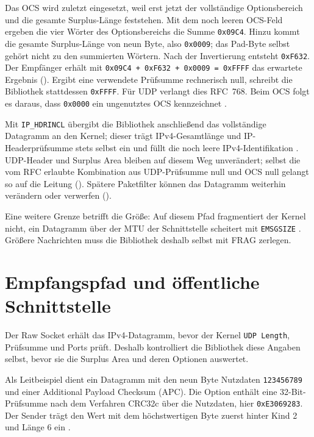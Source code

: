 Das OCS wird zuletzt eingesetzt, weil erst jetzt der vollständige Optionsbereich und die gesamte
Surplus-Länge feststehen. Mit dem noch leeren OCS-Feld ergeben die vier Wörter des Optionsbereichs die
Summe \texttt{0x09C4}. Hinzu kommt die gesamte Surplus-Länge von neun Byte, also \texttt{0x0009}; das
Pad-Byte selbst gehört nicht zu den summierten Wörtern. Nach der Invertierung entsteht \texttt{0xF632}.
Der Empfänger erhält mit \texttt{0x09C4 + 0xF632 + 0x0009 = 0xFFFF} das erwartete Ergebnis
(). Ergibt eine verwendete Prüfsumme rechnerisch null, schreibt die Bibliothek
stattdessen \texttt{0xFFFF}. Für UDP verlangt dies RFC~768. Beim OCS folgt es daraus, dass
\texttt{0x0000} ein ungenutztes OCS kennzeichnet \cites{rfc768}[Sec.~9]{rfc9868}.

Mit \texttt{IP\_HDRINCL} übergibt die Bibliothek anschließend das vollständige Datagramm an den Kernel;
dieser trägt IPv4-Gesamtlänge und IP-Headerprüfsumme stets selbst ein und füllt die noch leere
IPv4-Identifikation \cite{man7raw}. UDP-Header und Surplus Area bleiben auf diesem Weg unverändert; selbst
die vom RFC erlaubte Kombination aus UDP-Prüfsumme null und OCS null gelangt so auf die Leitung
(). Spätere Paketfilter können das Datagramm weiterhin verändern oder verwerfen
().

Eine weitere Grenze betrifft die Größe: Auf diesem Pfad fragmentiert der Kernel nicht, ein Datagramm über
der MTU der Schnittstelle scheitert mit \texttt{EMSGSIZE} \cite{man7raw}. Größere Nachrichten muss die
Bibliothek deshalb selbst mit FRAG zerlegen.

\section{Empfangspfad und öffentliche Schnittstelle}
\label{sec:empfangspfad}

Der Raw Socket erhält das IPv4-Datagramm, bevor der Kernel \texttt{UDP Length}, Prüfsumme und Ports prüft. Deshalb
kontrolliert die Bibliothek diese Angaben selbst, bevor sie die Surplus Area und deren Optionen auswertet.

Als Leitbeispiel dient ein Datagramm mit den neun Byte Nutzdaten \texttt{123456789} und einer Additional
Payload Checksum (APC). Die Option enthält eine 32-Bit-Prüfsumme nach dem Verfahren CRC32c über die
Nutzdaten, hier \texttt{0xE3069283}. Der Sender trägt den Wert mit dem höchstwertigen Byte zuerst hinter Kind 2 und
Länge 6 ein \cite[Sec.~11.3]{rfc9868}.

